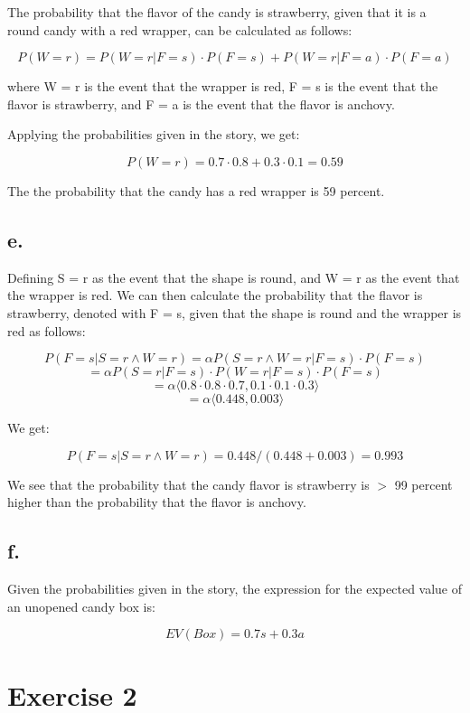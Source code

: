 \documentclass{article}
\begin{document}
The probability that the flavor of the candy is strawberry, given that it is a round candy with a red wrapper, can be calculated as follows:

\[P(W = r) = P(W = r | F = s) \cdot P(F = s) + P(W = r | F = a) \cdot P(F = a)\]

where W = r is the event that the wrapper is red, F = s is the event that the flavor is strawberry, and F = a is the event that the flavor is anchovy.

Applying the probabilities given in the story, we get:

\[P(W = r) = 0.7 \cdot 0.8 + 0.3 \cdot 0.1 = 0.59\]

The the probability that the candy has a red wrapper is 59 percent.


\subsection*{e.}

Defining S = r as the event that the shape is round, and W = r as the event that the wrapper is red. We can then calculate the probability that the flavor is strawberry, denoted with F = s, given that the shape is round and the wrapper is red as follows:

\[P(F = s | S = r \wedge W = r) = \alpha P(S = r \wedge W = r | F = s) \cdot P(F = s)\]
\[= \alpha P(S = r | F = s) \cdot P(W = r | F = s) \cdot P(F = s)\]
\[= \alpha \langle 0.8 \cdot 0.8 \cdot 0.7, 0.1 \cdot 0.1 \cdot 0.3 \rangle \]
\[= \alpha \langle 0.448, 0.003 \rangle\]

We get:

\[P(F = s | S = r \wedge W = r) = 0.448 / (0.448 + 0.003) = 0.993\]

We see that the probability that the candy flavor is strawberry is \(>\) 99 percent higher than the probability that the flavor is anchovy.

\subsection*{f.}

Given the probabilities given in the story, the expression for the expected value of an unopened candy box is:

\[EV(Box) = 0.7s + 0.3a\]


\section*{Exercise 2}
\end{document}

